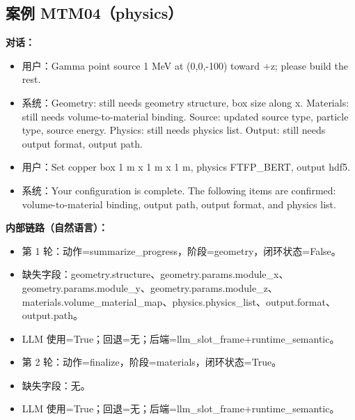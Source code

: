 \documentclass[11pt]{ctexart}
\begin{document}
\subsection{案例 MTM04（physics）}
\textbf{对话：}
\begin{itemize}
\item 用户：Gamma point source 1 MeV at (0,0,-100) toward +z; please build the rest.
\item 系统：Geometry: still needs geometry structure, box size along x. Materials: still needs volume-to-material binding. Source: updated source type, particle type, source energy. Physics: still needs physics list. Output: still needs output format, output path.
\item 用户：Set copper box 1 m x 1 m x 1 m, physics FTFP\_BERT, output hdf5.
\item 系统：Your configuration is complete. The following items are confirmed: volume-to-material binding, output path, output format, and physics list.
\end{itemize}
\textbf{内部链路（自然语言）：}
\begin{itemize}
\item 第 1 轮：动作=summarize\_progress，阶段=geometry，闭环状态=False。
\item 缺失字段：geometry.structure、geometry.params.module\_x、geometry.params.module\_y、geometry.params.module\_z、materials.volume\_material\_map、physics.physics\_list、output.format、output.path。
\item LLM 使用=True；回退=无；后端=llm\_slot\_frame+runtime\_semantic。
\item 第 2 轮：动作=finalize，阶段=materials，闭环状态=True。
\item 缺失字段：无。
\item LLM 使用=True；回退=无；后端=llm\_slot\_frame+runtime\_semantic。
\end{itemize}
\end{document}
